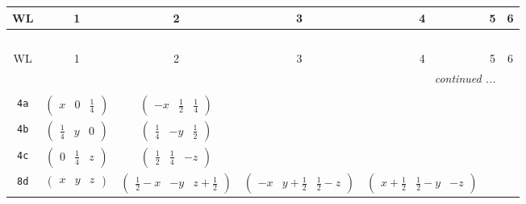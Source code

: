 \documentclass[fleqn,9pt,landscape]{jsarticle}
\begin{document}
\begin{center}
\renewcommand{\arraystretch}{1.2}
\begin{longtable}{ccccccc}
 \hline \hline
WL & 1 & 2 & 3 & 4 & 5 & 6 \\ \hline \endfirsthead

\multicolumn{6}{l}{\tablename\ \thetable{}} \\
 \hline \hline
WL & 1 & 2 & 3 & 4 & 5 & 6 \\ \hline \endhead

 \hline \hline
\multicolumn{6}{r}{\footnotesize\it continued ...} \\ \endfoot

 \hline \hline
\multicolumn{6}{r}{} \\ \endlastfoot

{\tt 4a} & $ \begin{pmatrix} x & 0 & \frac{1}{4} \end{pmatrix} $ & $ \begin{pmatrix} - x & \frac{1}{2} & \frac{1}{4} \end{pmatrix} $ & $  $ & $  $ \\ \hline
{\tt 4b} & $ \begin{pmatrix} \frac{1}{4} & y & 0 \end{pmatrix} $ & $ \begin{pmatrix} \frac{1}{4} & - y & \frac{1}{2} \end{pmatrix} $ & $  $ & $  $ \\ \hline
{\tt 4c} & $ \begin{pmatrix} 0 & \frac{1}{4} & z \end{pmatrix} $ & $ \begin{pmatrix} \frac{1}{2} & \frac{1}{4} & - z \end{pmatrix} $ & $  $ & $  $ \\ \hline
{\tt 8d} & $ \begin{pmatrix} x & y & z \end{pmatrix} $ & $ \begin{pmatrix} \frac{1}{2} - x & - y & z + \frac{1}{2} \end{pmatrix} $ & $ \begin{pmatrix} - x & y + \frac{1}{2} & \frac{1}{2} - z \end{pmatrix} $ & $ \begin{pmatrix} x + \frac{1}{2} & \frac{1}{2} - y & - z \end{pmatrix} $ \\
\end{longtable}
\end{center}
\end{document}
